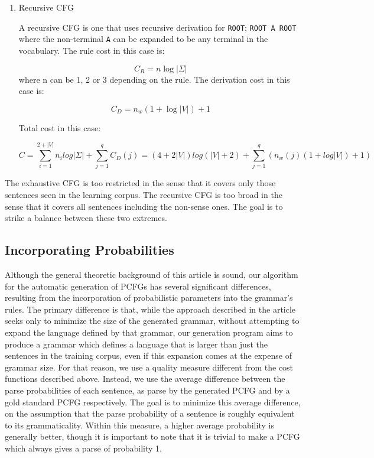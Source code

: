 \documentclass[paper=a4, fontsize=11pt]{scrartcl} %
\numberwithin{equation}{section} %
\numberwithin{figure}{section} %
\numberwithin{table}{section} %
\begin{document}
\begin{enumerate}[1.]
\item Recursive CFG

A recursive CFG is one that uses recursive derivation for \texttt{ROOT}; \texttt{ROOT \textrightarrow A ROOT} where the non-terminal \texttt{A} can be expanded to be any terminal in the vocabulary.
The rule cost in this case is:

\begin{equation}\label{first}
C_R = n \log \lvert \Sigma \rvert
\end{equation}
where n can be 1, 2 or 3 depending on the rule.
The derivation cost in this case is:

\begin{equation}\label{first}
C_D = n_w(1 + \log \lvert V \rvert) + 1
\end{equation}

Total cost in this case:

\begin{equation}\label{first}
C = \sum \limits_{i=1}^{2+\lvert V \rvert}n_i log \lvert \Sigma \rvert + \sum \limits_{j=1}^q C_D(j) = (4 + 2\lvert V \rvert)log(\lvert V \rvert + 2) + \sum \limits_{j=1}^q (n_w(j)(1 + log \lvert V \rvert) + 1)
\end{equation}

\end{enumerate}

The exhaustive CFG is too restricted in the sense that it covers only those sentences seen in the learning corpus. The recursive CFG is too broad in the sense that it covers all sentences including the non-sense ones. The goal is to strike a balance between these two extremes.

\subsection{Incorporating Probabilities}
Although the general theoretic background of this article is sound, our algorithm for the automatic generation of PCFGs has several significant differences, resulting from the incorporation of probabilistic parameters into the grammar's rules. The primary difference is that, while the approach described in the article seeks only to minimize the size of the generated grammar, without attempting to expand the language defined by that grammar, our generation program aims to produce a grammar which defines a language that is larger than just the sentences in the training corpus, even if this expansion comes at the expense of grammar size. For that reason, we use a quality measure different from the cost functions described above. Instead, we use the average difference between the parse probabilities of each sentence, as parse by the generated PCFG and by a gold standard PCFG respectively. The goal is to minimize this average difference, on the assumption that the parse probability of a sentence is roughly equivalent to its grammaticality. Within this measure, a higher average probability is generally better, though it is important to note that it is trivial to make a PCFG which always gives a parse of probability 1.
\end{document}
